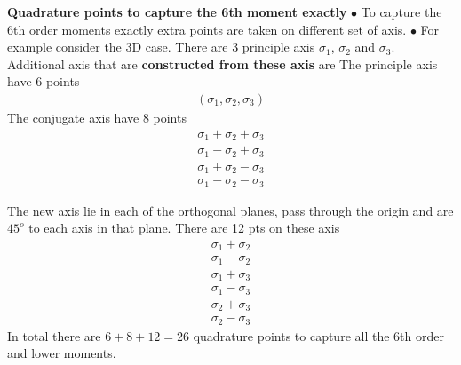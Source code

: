 \documentclass[landscape]{slides}
\begin{document}
\begin{slide}
{\bf Quadrature points to capture the 6th moment exactly }\newline
$\bullet$ To capture the 6th order moments exactly extra points are taken on different set of axis.\newline
$\bullet$ For example consider the 3D case. There are 3 principle axis $\sigma_1$, $\sigma_2$ and $\sigma_3$. Additional axis that are {\bf constructed from these axis} are\newline
The principle axis have 6 points
 \begin{align*}
 (\sigma_1,
 \sigma_2,
 \sigma_3)
 \end{align*}
The conjugate axis have 8 points
\begin{align*}
\sigma_1+\sigma_2+\sigma_3\\
\sigma_1-\sigma_2+\sigma_3\\
\sigma_1+\sigma_2-\sigma_3\\
\sigma_1-\sigma_2-\sigma_3
\end{align*}   	
\end{slide}
\begin{slide}
The new axis lie in each of the orthogonal planes, pass through the origin and are $45^o$ to each axis in that plane. There are 12 pts on these axis
\begin{align*}
\sigma_1+\sigma_2\\
\sigma_1-\sigma_2\\
\sigma_1+\sigma_3\\
\sigma_1-\sigma_3\\
\sigma_2+\sigma_3\\
\sigma_2-\sigma_3
\end{align*}
 In total there are $6+8+12=26$ quadrature points to capture all the 6th order and lower moments.
    	\end{slide}
\end{document}
